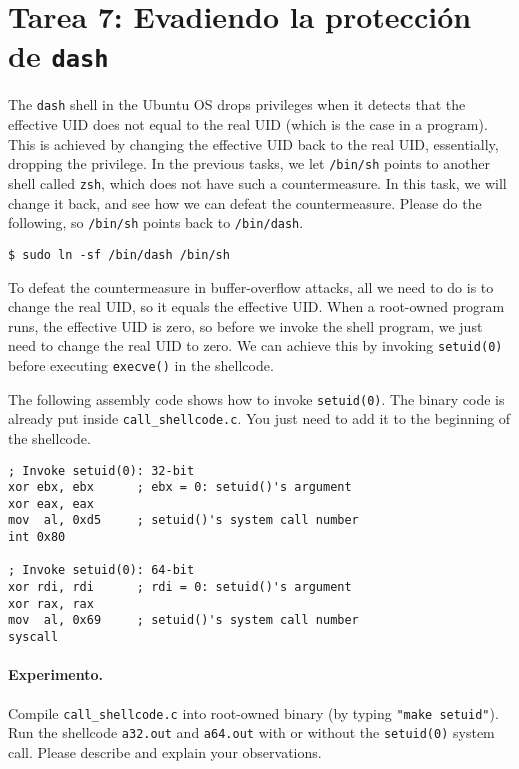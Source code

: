 \section{Tarea 7: Evadiendo la protección de \texttt{dash}}

The \texttt{dash} shell in the Ubuntu OS 
drops privileges when it detects that the effective UID does not 
equal to the real UID (which is the case in a \setuid program). 
This is achieved by changing the 
effective UID back to the real UID, essentially, dropping the 
privilege.  In the previous tasks, we let \texttt{/bin/sh} points
to another shell called \texttt{zsh}, which does not have such
a countermeasure. In this task, we will change it back, 
and see how we can defeat the countermeasure. Please 
do the following, so \texttt{/bin/sh} points back to 
\texttt{/bin/dash}. 


\begin{lstlisting}
$ sudo ln -sf /bin/dash /bin/sh
\end{lstlisting}

To defeat the countermeasure in buffer-overflow attacks,
all we need to do is to change the real UID, so it equals the 
effective UID. When a root-owned \setuid program runs, the 
effective UID is zero, so before we invoke the shell program,
we just need to change the real UID to zero.
We can achieve this by invoking \texttt{setuid(0)} before executing 
\texttt{execve()} in the shellcode. 

The following assembly code shows how to invoke
\texttt{setuid(0)}. The binary code is already put inside 
\texttt{call\_shellcode.c}. You just need to add it to the 
beginning of the shellcode. 

\begin{lstlisting}[language={[x86masm]Assembler}]
; Invoke setuid(0): 32-bit
xor ebx, ebx      ; ebx = 0: setuid()'s argument
xor eax, eax
mov  al, 0xd5     ; setuid()'s system call number
int 0x80

; Invoke setuid(0): 64-bit
xor rdi, rdi      ; rdi = 0: setuid()'s argument
xor rax, rax       
mov  al, 0x69     ; setuid()'s system call number
syscall
\end{lstlisting}


\paragraph{Experimento.} Compile \texttt{call\_shellcode.c} into
root-owned binary (by typing \texttt{"make setuid"}). 
Run the shellcode \texttt{a32.out} and \texttt{a64.out} with or without 
the \texttt{setuid(0)} system call. Please describe and explain
your observations. 


